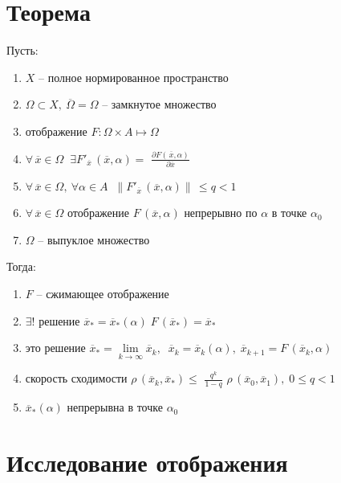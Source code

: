 \documentclass[a4paper,12pt]{article}
\begin{document}
\section{\textcolor{Mulberry}{Теорема}}
\par\bigskip
Пусть:
\begin{enumerate}\label{lst:th}
\item $X$ -- полное нормированное пространство
\item $ \Omega \subset X, \: \overline{\Omega} = \Omega$ -- замкнутое множество
\item отображение $ F: \Omega \times A \mapsto \Omega $
\item $ \forall\,\overline{x} \in \Omega \;\; 
        \exists F'_{\overline{x}}\,(\overline{x}, \alpha) = $
        \large$\frac{\partial F(\,\overline{x}, \alpha)}
        {\partial \overline{x}} $ \normalsize
\item $ \forall\,\overline{x} \in \Omega , \: \forall \alpha \in A \;\; 
        \bigl\| F'_{\overline{x}}\,(\overline{x}, \alpha) \bigr\| \, \leq q < 1 $
\item $ \forall\,\overline{x} \in \Omega $ 
        отображение $ F\,(\overline{x}, \alpha) $ 
        непрерывно по $\alpha$ в точке $\alpha_0$
\item $ \Omega $ -- выпуклое множество
\end{enumerate}
Тогда:
\begin{enumerate}
\item $F$ -- сжимающее отображение
\item $ \exists !$ решение $\overline{x}_* =
        \overline{x}_*(\alpha) \; F\,(\overline{x}_*)=\overline{x}_*$ 
\item это решение $ \overline{x}_* = \lim\limits_{k\to\infty}\overline{x}_k, 
        \;\; \overline{x}_k = \overline{x}_k(\alpha), \; 
        \overline{x}_{k+1} = F\,(\overline{x}_k,\alpha)$ 
\item скорость сходимости 
        $ \rho\,(\overline{x}_k, \overline{x}_*) \leq $ 
        \large $ \frac{q^k}{1-q} $ \normalsize
        $ \rho\,(\overline{x}_0,\overline{x}_1), 
        \; 0 \leq q < 1 $
\item $ \overline{x}_*(\alpha)$ непрерывна в точке $ \alpha_0 $
\end{enumerate}




\newpage
\section{\textcolor{Rhodamine}{Исследование отображения}}
\par\bigskip
\end{document}

